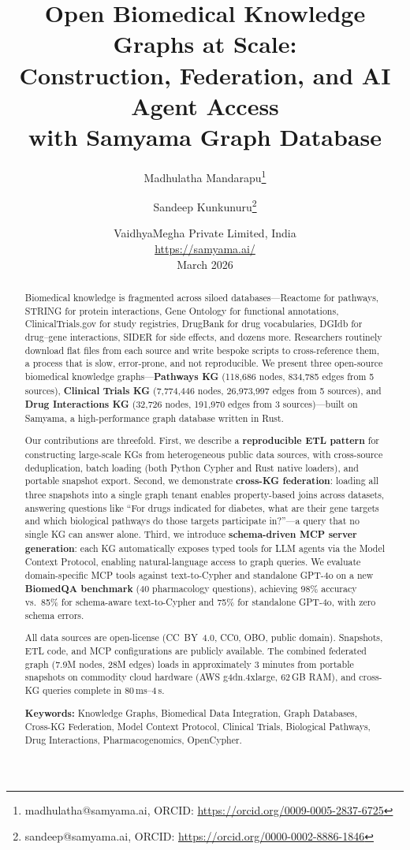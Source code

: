 \documentclass[11pt]{article}
\title{Open Biomedical Knowledge Graphs at Scale:\\Construction, Federation, and AI Agent Access\\with Samyama Graph Database}
\author{
  Madhulatha Mandarapu\thanks{madhulatha@samyama.ai, ORCID: \url{https://orcid.org/0009-0005-2837-6725}} \and
  Sandeep Kunkunuru\thanks{sandeep@samyama.ai, ORCID: \url{https://orcid.org/0000-0002-8886-1846}}
}
\date{%
  VaidhyaMegha Private Limited, India\\[2pt]
  \url{https://samyama.ai/}\\[8pt]
  March 2026
}
\begin{document}
\maketitle

\begin{abstract}
Biomedical knowledge is fragmented across siloed databases---Reactome for pathways, STRING for protein interactions, Gene Ontology for functional annotations, ClinicalTrials.gov for study registries, DrugBank for drug vocabularies, DGIdb for drug--gene interactions, SIDER for side effects, and dozens more. Researchers routinely download flat files from each source and write bespoke scripts to cross-reference them, a process that is slow, error-prone, and not reproducible. We present three open-source biomedical knowledge graphs---\textbf{Pathways KG} (118,686 nodes, 834,785 edges from 5 sources), \textbf{Clinical Trials KG} (7,774,446 nodes, 26,973,997 edges from 5 sources), and \textbf{Drug Interactions KG} (32,726 nodes, 191,970 edges from 3 sources)---built on Samyama, a high-performance graph database written in Rust.

Our contributions are threefold. First, we describe a \textbf{reproducible ETL pattern} for constructing large-scale KGs from heterogeneous public data sources, with cross-source deduplication, batch loading (both Python Cypher and Rust native loaders), and portable snapshot export. Second, we demonstrate \textbf{cross-KG federation}: loading all three snapshots into a single graph tenant enables property-based joins across datasets, answering questions like ``For drugs indicated for diabetes, what are their gene targets and which biological pathways do those targets participate in?''---a query that no single KG can answer alone. Third, we introduce \textbf{schema-driven MCP server generation}: each KG automatically exposes typed tools for LLM agents via the Model Context Protocol, enabling natural-language access to graph queries. We evaluate domain-specific MCP tools against text-to-Cypher and standalone GPT-4o on a new \textbf{BiomedQA benchmark} (40 pharmacology questions), achieving 98\% accuracy vs.\ 85\% for schema-aware text-to-Cypher and 75\% for standalone GPT-4o, with zero schema errors.

All data sources are open-license (CC~BY~4.0, CC0, OBO, public domain). Snapshots, ETL code, and MCP configurations are publicly available. The combined federated graph (7.9M nodes, 28M edges) loads in approximately 3 minutes from portable snapshots on commodity cloud hardware (AWS g4dn.4xlarge, 62\,GB RAM), and cross-KG queries complete in 80\,ms--4\,s.

\noindent\textbf{Keywords:} Knowledge Graphs, Biomedical Data Integration, Graph Databases, Cross-KG Federation, Model Context Protocol, Clinical Trials, Biological Pathways, Drug Interactions, Pharmacogenomics, OpenCypher.
\end{abstract}
\end{document}
